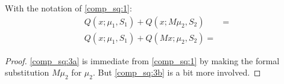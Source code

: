 \documentclass[12pt,leqno]{article}
\begin{document}
\begin{Lem}\label{comp_sq:3}
With the notation of \eqref{comp_sq:1}:
\begin{align}
  Q(x;\mu_1,S_1) + Q(x;M\mu_2,S_2) &= \label{comp_sq:3a}\\
  Q(x;\mu_1,S_1) + Q(Mx;\mu_2,S_2) = \label{comp_sq:3b}
\end{align}
\end{Lem}
\begin{proof}
\eqref{comp_sq:3a} is immediate from \eqref{comp_sq:1} by making the formal substitution $M\mu_2$ for $\mu_2$.  But \eqref{comp_sq:3b} is a bit more involved.  

\end{proof}
\end{document}
